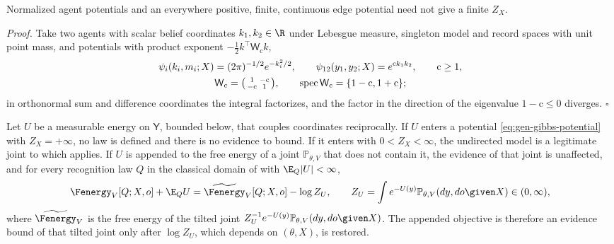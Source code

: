 Normalized agent potentials and an everywhere positive, finite, continuous edge potential need not give a
finite $Z_X$. 

\noindent\emph{Proof.}
Take two agents with scalar belief coordinates $k_1,k_2\in\R$ under Lebesgue measure, singleton model and
record spaces with unit point mass, and potentials with product exponent
$-\tfrac12k^\top\mathsf W_{\mathrm c}k$,
\begin{gather}
\psi_i(k_i,m_i;X)=(2\pi)^{-1/2}e^{-k_i^2/2},
\qquad
\psi_{12}(y_1,y_2;X)=e^{\mathrm ck_1k_2},
\qquad \mathrm c\geq1,
\label{eq:gen-gibbs-counterexample}\\
\mathsf W_{\mathrm c}=\begin{psmallmatrix}1&-\mathrm c\\-\mathrm c&1\end{psmallmatrix},
\qquad
\operatorname{spec}\mathsf W_{\mathrm c}=\{1-\mathrm c,1+\mathrm c\};
\label{eq:gen-gibbs-counterexample-matrix}
\end{gather}
in orthonormal sum and difference coordinates the integral factorizes, and the factor in the direction of
the eigenvalue $1-\mathrm c\leq0$ diverges. \hfill$\square$

Let $U$ be a measurable energy on $\mathsf Y$, bounded below, that couples coordinates reciprocally. If $U$
enters a potential \eqref{eq:gen-gibbs-potential} with $Z_X=+\infty$, no law is defined and there is no
evidence to bound. If it enters with $0<Z_X<\infty$, the undirected model is a legitimate joint to which
 applies. If $U$ is appended to the free energy of a joint $\mathbb P_{\theta,V}$ that does not
contain it, the evidence of that joint is unaffected, and for every recognition law $Q$ in the classical
domain of  with $\E_Q\lvert U\rvert<\infty$,
\begin{equation}
\Fenergy_V[Q;X,o]+\E_QU=\widetilde\Fenergy_V[Q;X,o]-\log Z_U,
\qquad
Z_U=\int e^{-U(y)}\mathbb P_{\theta,V}(dy,do\given X)\in(0,\infty),
\label{eq:gen-appended-energy}
\end{equation}
where $\widetilde\Fenergy_V$ is the free energy of the tilted joint
$Z_U^{-1}e^{-U(y)}\mathbb P_{\theta,V}(dy,do\given X)$. The appended objective is therefore an evidence bound of
that tilted joint only after $\log Z_U$, which depends on $(\theta,X)$, is restored. 

